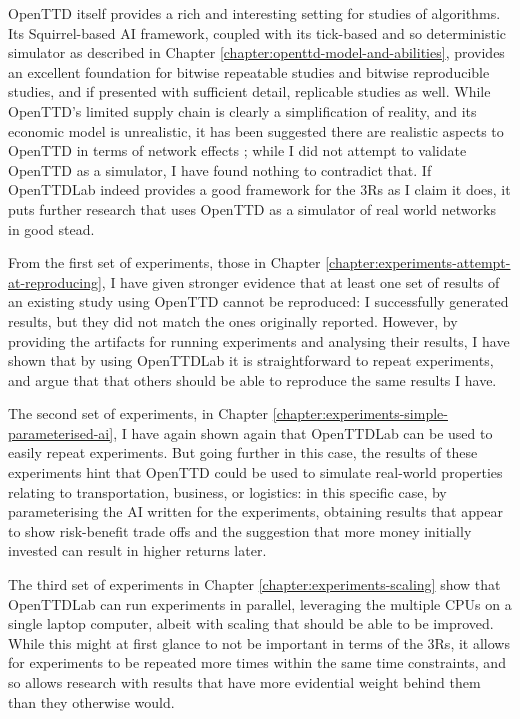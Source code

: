 \documentclass[logo,msc,dsti]{style/infthesis}    %
\begin{document}
{OpenTTD itself provides a rich and interesting setting for studies of algorithms. Its Squirrel-based AI framework, coupled with its tick-based and so deterministic simulator as described in Chapter \ref{chapter:openttd-model-and-abilities}, provides an excellent foundation for bitwise repeatable studies and bitwise reproducible studies, and if presented with sufficient detail, replicable studies as well. While OpenTTD's limited supply chain is clearly a simplification of reality, and its economic model is unrealistic, it has been suggested there are realistic aspects to OpenTTD in terms of network effects \cite{raghothama2013review}; while I did not attempt to validate OpenTTD as a simulator, I have found nothing to contradict that. If OpenTTDLab indeed provides a good framework for the 3Rs as I claim it does, it puts further research that uses OpenTTD as a simulator of real world networks in good stead.

From the first set of experiments, those in Chapter \ref{chapter:experiments-attempt-at-reproducing}, I have given stronger evidence that at least one set of results of an existing study using OpenTTD cannot be reproduced: I successfully generated results, but they did not match the ones originally reported. However, by providing the artifacts for running experiments and analysing their results, I have shown that by using OpenTTDLab it is straightforward to repeat experiments, and argue that that others should be able to reproduce the same results I have.

The second set of experiments, in Chapter \ref{chapter:experiments-simple-parameterised-ai}, I have again shown again that OpenTTDLab can be used to easily repeat experiments. But going further in this case, the results of these experiments hint that OpenTTD could be used to simulate real-world properties relating to transportation, business, or logistics: in this specific case, by parameterising the AI written for the experiments, obtaining results that appear to show risk-benefit trade offs and the suggestion that more money initially invested can result in higher returns later.

The third set of experiments in Chapter \ref{chapter:experiments-scaling} show that OpenTTDLab can run experiments in parallel, leveraging the multiple CPUs on a single laptop computer, albeit with scaling that should be able to be improved. While this might at first glance to not be important in terms of the 3Rs, it allows for experiments to be repeated more times within the same time constraints, and so allows research with results that have more evidential weight behind them than they otherwise would.

}
\end{document}
